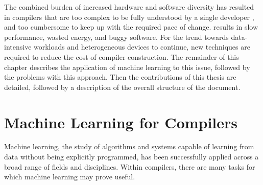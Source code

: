 
The combined burden of increased hardware and software diversity has resulted in compilers that are too complex to be fully understood by a single developer , and too cumbersome to keep up with the required pace of change.  results in slow performance, wasted energy, and buggy software. For the trend towards data-intensive workloads and heterogeneous devices to continue, new techniques are required to reduce the cost of compiler construction. The remainder of this chapter describes the application of machine learning to this issue, followed by the problems with this approach. Then the contributions of this thesis are detailed, followed by a description of the overall structure of the document.


\section{Machine Learning for Compilers}

Machine learning, the study of algorithms and systems capable of learning from data without being explicitly programmed, has been successfully applied across a broad range of fields and disciplines. Within compilers, there are many tasks for which machine learning may prove useful.

